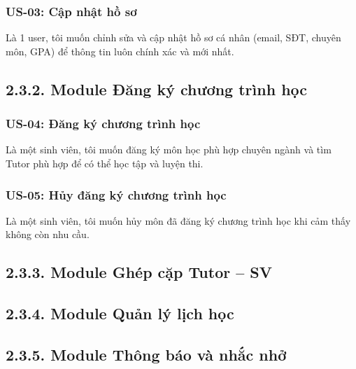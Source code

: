 \subsubsection*{US-03: Cập nhật hồ sơ} 
Là 1 user, tôi muốn chỉnh sửa và cập nhật hồ sơ cá nhân (email, SĐT, chuyên môn, GPA) để thông tin luôn chính xác và mới nhất.


\subsection*{2.3.2. Module Đăng ký chương trình học}
\subsubsection*{US-04: Đăng ký chương trình học} 
Là một sinh viên, tôi muốn đăng ký môn học phù hợp chuyên ngành và tìm Tutor phù hợp để có thể học tập và luyện thi.
\subsubsection*{US-05: Hủy đăng ký chương trình học} 
Là một sinh viên, tôi muốn hủy môn đã đăng ký chương trình học khi cảm thấy không còn nhu cầu.


\subsection*{2.3.3. Module Ghép cặp Tutor – SV}


\subsection*{2.3.4. Module Quản lý lịch học}


\subsection*{2.3.5. Module Thông báo và nhắc nhở}

